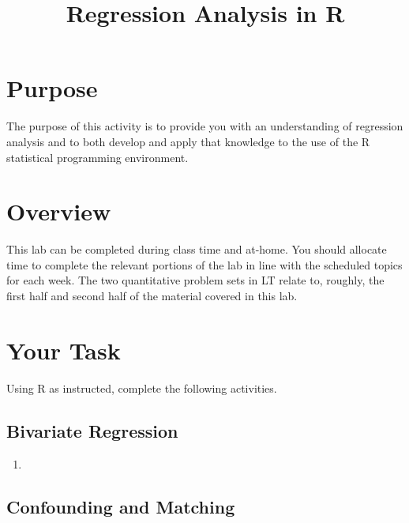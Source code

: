 \documentclass[a4paper,12pt]{article}
\title{Regression Analysis in R}
\author{}
\date{}
\begin{document}
\vspace{-4em}

\maketitle

\vspace{-4em}

\section{Purpose}

The purpose of this activity is to provide you with an understanding of regression analysis and to both develop and apply that knowledge to the use of the R statistical programming environment.

\section{Overview}

This lab can be completed during class time and at-home. You should allocate time to complete the relevant portions of the lab in line with the scheduled topics for each week. The two quantitative problem sets in LT relate to, roughly, the first half and second half of the material covered in this lab.

\section{Your Task}

Using R as instructed, complete the following activities.

\subsection{Bivariate Regression}

\begin{enumerate}
\item 




\end{enumerate}

\subsection{Confounding and Matching}
\end{document}
